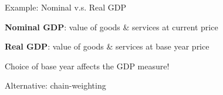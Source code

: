\documentclass[11pt,aspectratio=169,usenames,dvipsnames]{beamer}
\let\tempone\itemize
\let\temptwo\enditemize
\renewenvironment{itemize}{\tempone\addtolength{\itemsep}{\fill}}{\temptwo}
\begin{document}
\begin{frame}{Example: Nominal v.s. Real GDP}
\label{slide:Example__Nominal_v_s__Real_GDP}
    \begin{itemize}
        \item \textbf{Nominal GDP}: value of goods \& services at current price
        \item \textbf{Real GDP}: value of goods \& services at base year price
    \end{itemize}
\begin{center}
\end{center}
\begin{itemize}
    \item Choice of base year affects the GDP measure!
    \item Alternative: chain-weighting
\end{itemize}

\end{frame}
\end{document}
